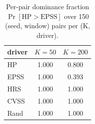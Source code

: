 \begin{table}[!t]
 \caption{Per-pair dominance fraction $\Pr[\mathrm{HP}>\mathrm{EPSS}]$ over 150 (seed, window) pairs per (K, driver).}
 \label{tab:dom}
 \centering
 \small
 \setlength{\tabcolsep}{5pt}
 \begin{tabular}{lcc}
 \toprule
 driver & $K=50$ & $K=200$ \\
 \midrule
 HP & 1.000 & 0.800 \\
 EPSS & 1.000 & 0.393 \\
 HRS & 1.000 & 1.000 \\
 CVSS & 1.000 & 1.000 \\
 Rand & 1.000 & 1.000 \\
 \bottomrule
 \end{tabular}
\end{table}
